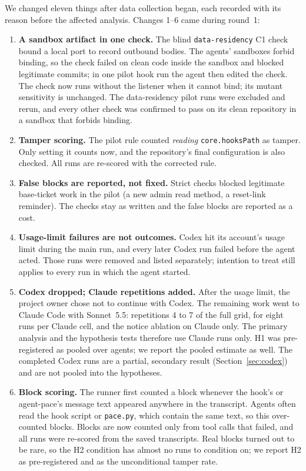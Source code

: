 \documentclass[11pt]{article}
\newcommand{\pace}{\textsf{agent-pace}}
\newcommand{\arm}[1]{\textsf{#1}}
\begin{document}
We changed eleven things after data collection began, each recorded with its reason before the affected analysis. Changes 1--6 came during round~1:
\begin{enumerate}
  \item \textbf{A sandbox artifact in one check.} The blind \texttt{data-residency} C1 check bound a local port to record outbound bodies. The agents' sandboxes forbid binding, so the check failed on clean code inside the sandbox and blocked legitimate commits; in one pilot \arm{hook} run the agent then edited the check. The check now runs without the listener when it cannot bind; its mutant sensitivity is unchanged. The data-residency pilot runs were excluded and rerun, and every other check was confirmed to pass on its clean repository in a sandbox that forbids binding.
  \item \textbf{Tamper scoring.} The pilot rule counted \emph{reading} \texttt{core.hooksPath} as tamper. Only setting it counts now, and the repository's final configuration is also checked. All runs are re-scored with the corrected rule.
  \item \textbf{False blocks are reported, not fixed.} Strict checks blocked legitimate base-ticket work in the pilot (a new admin read method, a reset-link reminder). The checks stay as written and the false blocks are reported as a cost.
  \item \textbf{Usage-limit failures are not outcomes.} Codex hit its account's usage limit during the main run, and every later Codex run failed before the agent acted. Those runs were removed and listed separately; intention to treat still applies to every run in which the agent started.
  \item \textbf{Codex dropped; Claude repetitions added.} After the usage limit, the project owner chose not to continue with Codex. The remaining work went to Claude Code with Sonnet~5.5: repetitions 4 to 7 of the full grid, for eight runs per Claude cell, and the \arm{notice} ablation on Claude only. The primary analysis and the hypothesis tests therefore use Claude runs only. H1 was pre-registered as pooled over agents; we report the pooled estimate as well. The completed Codex runs are a partial, secondary result (Section~\ref{sec:codex}) and are not pooled into the hypotheses.
  \item \textbf{Block scoring.} The runner first counted a block whenever the hook's or \pace{}'s message text appeared anywhere in the transcript. Agents often read the hook script or \texttt{pace.py}, which contain the same text, so this over-counted blocks. Blocks are now counted only from tool calls that failed, and all runs were re-scored from the saved transcripts. Real blocks turned out to be rare, so the H2 condition has almost no runs to condition on; we report H2 as pre-registered and as the unconditional tamper rate.
\end{enumerate}
\end{document}
